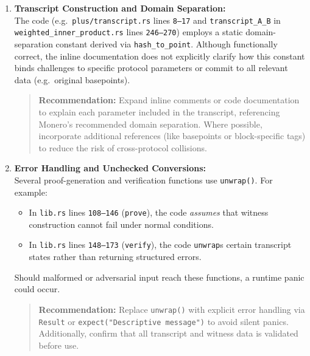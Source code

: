 \documentclass[12pt,a4paper]{article}
\begin{document}
\begin{enumerate}
    \item \textbf{Transcript Construction and Domain Separation:}\\
    The code (e.g.\ \texttt{plus/transcript.rs} lines \texttt{8--17} and \texttt{transcript\_A\_B} in \texttt{weighted\_inner\_product.rs} lines \texttt{246--270}) employs a static domain-separation constant derived via \texttt{hash\_to\_point}. Although functionally correct, the inline documentation does not explicitly clarify how this constant binds challenges to specific protocol parameters or commit to all relevant data (e.g.\ original basepoints).
    \begin{quote}
        \textbf{Recommendation:} Expand inline comments or code documentation to explain each parameter included in the transcript, referencing Monero’s recommended domain separation. Where possible, incorporate additional references (like basepoints or block-specific tags) to reduce the risk of cross-protocol collisions.
    \end{quote}

    \item \textbf{Error Handling and Unchecked Conversions:}\\
    Several proof-generation and verification functions use \texttt{unwrap()}. For example:
    \begin{itemize}
        \item In \texttt{lib.rs} lines \texttt{108--146} (\texttt{prove}), the code \emph{assumes} that witness construction cannot fail under normal conditions.
        \item In \texttt{lib.rs} lines \texttt{148--173} (\texttt{verify}), the code \texttt{unwrap}s certain transcript states rather than returning structured errors.
    \end{itemize}
    Should malformed or adversarial input reach these functions, a runtime panic could occur.
    \begin{quote}
        \textbf{Recommendation:} Replace \texttt{unwrap()} with explicit error handling via \texttt{Result} or \texttt{expect("Descriptive message")} to avoid silent panics. Additionally, confirm that all transcript and witness data is validated before use.
    \end{quote}


\end{enumerate}
\end{document}
